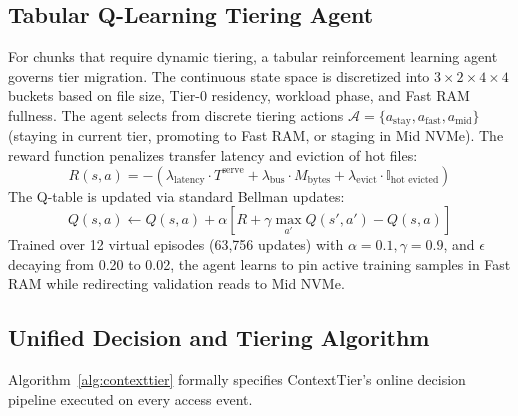\documentclass[conference]{IEEEtran}
\begin{document}
\subsection{Tabular Q-Learning Tiering Agent}
For chunks that require dynamic tiering, a tabular reinforcement learning agent~\cite{sutton2018reinforcement} governs tier migration. The continuous state space is discretized into $3 \times 2 \times 4 \times 4$ buckets based on file size, Tier-0 residency, workload phase, and Fast RAM fullness.
The agent selects from discrete tiering actions $\mathcal{A} = \{a_{\text{stay}}, a_{\text{fast}}, a_{\text{mid}}\}$ (staying in current tier, promoting to Fast RAM, or staging in Mid NVMe). The reward function penalizes transfer latency and eviction of hot files:
\begin{equation}
R(s, a) = - \left( \lambda_{\text{latency}} \cdot T^{\text{serve}} + \lambda_{\text{bus}} \cdot M_{\text{bytes}} + \lambda_{\text{evict}} \cdot \mathbb{I}_{\text{hot evicted}} \right)
\end{equation}
The Q-table is updated via standard Bellman updates:
\begin{equation}
Q(s, a) \leftarrow Q(s, a) + \alpha \left[ R + \gamma \max_{a'} Q(s', a') - Q(s, a) \right]
\end{equation}
Trained over 12 virtual episodes (63,756 updates) with $\alpha=0.1, \gamma=0.9$, and $\epsilon$ decaying from 0.20 to 0.02, the agent learns to pin active training samples in Fast RAM while redirecting validation reads to Mid NVMe.

\subsection{Unified Decision and Tiering Algorithm}
Algorithm~\ref{alg:contexttier} formally specifies ContextTier's online decision pipeline executed on every access event.
\end{document}
